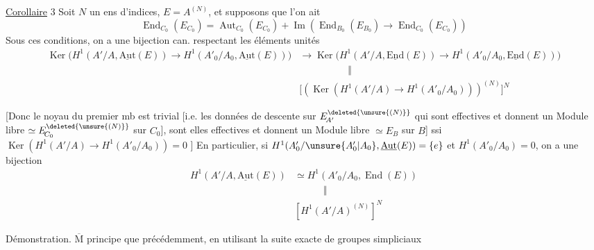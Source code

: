 \uline{Corollaire} 3 Soit $N$ un ens d'indices, 
$E=A^{(N)}$, et supposons que l'on ait
\[
\operatorname{End}_{C_0}(E_{C_0})=\operatorname{Aut}_{C_0}(E_{C_0})
+\operatorname{Im}(\operatorname{End}_{B_0}(E_{B_0})\to\operatorname{End}_{C_0}(E_{C_0}))
\]
Sous ces conditions, on a une bijection can.
respectant les éléments unités
\[
\begin{aligned}
\operatorname{Ker}\big(H^1(A'/A,\underline{\mathrm{Aut}}(E))\to H^1(A'_0/A_0,\underline{\mathrm{Aut}}(E))\big)&\to
\operatorname{Ker}\big(H^1(A'/A,\underline{\mathrm{End}}(E))\to H^1(A'_0/A_0,\underline{\mathrm{End}}(E))\big)\\
&\hspace{5em}\Vert\\
&\big[(\operatorname{Ker}(H^1(A'/A)\to H^1(A'_0/A_0)))^{(N)}\big]^{N}
\end{aligned}
\]

[Donc le noyau du premier mb est trivial [i.e.
les données de descente sur $E_{\!A'}^{\deleted{\unsure{(N)}}}$ qui sont 
 effectives et donnent un Module libre  $\simeq E_{\!C_0}^{\deleted{\unsure{(N)}}}$
sur $C_0$], sont elles  effectives et donnent
un Module libre $\simeq E_B$ sur $B$] ssi
$\operatorname{Ker}(H^1(A'/A)\to H^1(A'_0/A_0))=0$ ] En particulier,
si $H^1(A'_0/\unsure{A'_0|A_0},\underline{\mathrm{Aut}}(E))=\{e\}$ et $H^1(A'_0/A_0)=0$, on a
une bijection
\[
\begin{aligned}
H^1(A'/A,\underline{\mathrm{Aut}}(E))&\simeq H^1(A'_0/A_0,\operatorname{End}(E))\\
&\hspace{3em}\Vert\\
&[H^1(A'/A)^{(N)}]^N
\end{aligned}
\]

Démonstration. $\overline{\mathrm M}$ principe que précédemment,
en utilisant la suite exacte de groupes simpliciaux
